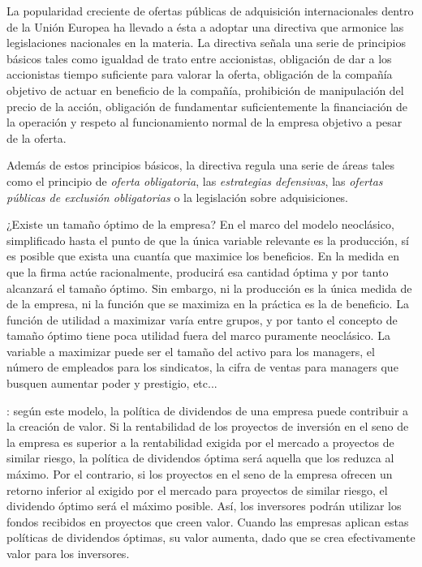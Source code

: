 \documentclass{nuevotema}
\begin{document}
\conceptos



 La popularidad creciente de ofertas públicas de adquisición internacionales dentro de la Unión Europea ha llevado a ésta a adoptar una directiva que armonice las legislaciones nacionales en la materia. La directiva señala una serie de principios básicos tales como igualdad de trato entre accionistas, obligación de dar a los accionistas tiempo suficiente para valorar la oferta, obligación de la compañía objetivo de actuar en beneficio de la compañía, prohibición de manipulación del precio de la acción, obligación de fundamentar suficientemente la financiación de la operación y respeto al funcionamiento normal de la empresa objetivo a pesar de la oferta.

Además de estos principios básicos, la directiva regula una serie de áreas tales como el principio de \textit{oferta obligatoria}, las \textit{estrategias defensivas}, las \textit{ofertas públicas de exclusión obligatorias} o la legislación sobre adquisiciones.


 ¿Existe un tamaño óptimo de la empresa? En el marco del modelo neoclásico, simplificado hasta el punto de que la única variable relevante es la producción, sí es posible que exista una cuantía que maximice los beneficios. En la medida en que la firma actúe racionalmente, producirá esa cantidad óptima y por tanto alcanzará el tamaño óptimo. Sin embargo, ni la producción es la única medida de  de la empresa, ni la función que se maximiza en la práctica es la de beneficio. La función de utilidad a maximizar varía entre grupos, y por tanto el concepto de tamaño óptimo tiene poca utilidad fuera del marco puramente neoclásico. La variable a maximizar puede ser el tamaño del activo para los managers, el número de empleados para los sindicatos, la cifra de ventas para managers que busquen aumentar poder y prestigio, etc...

: según este modelo, la política de dividendos de una empresa puede contribuir a la creación de valor. Si la rentabilidad de los proyectos de inversión en el seno de la empresa es superior a la rentabilidad exigida por el mercado a proyectos de similar riesgo, la política de dividendos óptima será aquella que los reduzca al máximo. Por el contrario, si los proyectos en el seno de la empresa ofrecen un retorno inferior al exigido por el mercado para proyectos de similar riesgo, el dividendo óptimo será el máximo posible. Así, los inversores podrán utilizar los fondos recibidos en proyectos que creen valor. Cuando las empresas aplican estas políticas de dividendos óptimas, su valor aumenta, dado que se crea efectivamente valor para los inversores.
\end{document}
